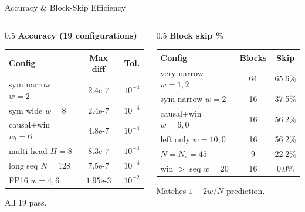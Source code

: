 \documentclass[10pt,aspectratio=169]{beamer}
\begin{document}
\begin{frame}{Accuracy \& Block-Skip Efficiency}
  \begin{columns}[T]
    \begin{column}{0.5\textwidth}
      \centering\scriptsize
      \textbf{Accuracy (19 configurations)}\\
      \begin{tabular}{@{}lcc@{}}
        \toprule
        \textbf{Config} & \textbf{Max diff} & \textbf{Tol.}\\
        \midrule
        sym narrow $w{=}2$   & $2.4\text{e-}7$  & $10^{-4}$\\
        sym wide   $w{=}8$   & $2.4\text{e-}7$  & $10^{-4}$\\
        causal+win $w_l{=}6$ & $4.8\text{e-}7$  & $10^{-4}$\\
        multi-head $H{=}8$   & $8.3\text{e-}7$  & $10^{-4}$\\
        long seq   $N{=}128$ & $7.5\text{e-}7$  & $10^{-4}$\\
        \alert{FP16} $w{=}4,6$ & $1.95\text{e-}3$ & $10^{-2}$\\
        \bottomrule
      \end{tabular}

      All 19 pass.
    \end{column}
    \begin{column}{0.5\textwidth}
      \centering\scriptsize
      \textbf{Block skip \%}\\
      \begin{tabular}{@{}lcc@{}}
        \toprule
        \textbf{Config} & \textbf{Blocks} & \textbf{Skip}\\
        \midrule
        very narrow $w{=}1,2$ & 64 & \alert{65.6\%}\\
        sym narrow  $w{=}2$   & 16 & 37.5\%\\
        causal+win  $w{=}6,0$ & 16 & 56.2\%\\
        left only   $w{=}10,0$ & 16 & 56.2\%\\
        $N{=}N_s{=}45$        &  9 & 22.2\%\\
        win $>$ seq $w{=}20$  & 16 & 0.0\%\\
        \bottomrule
      \end{tabular}

      Matches $1 - 2w/N$ prediction.
    \end{column}
  \end{columns}
\end{frame}
\end{document}
